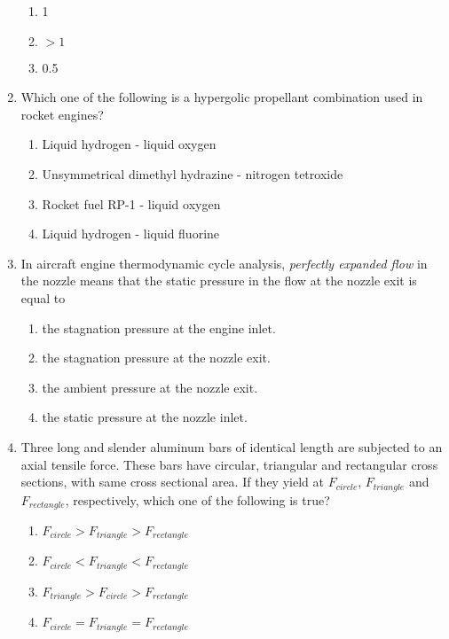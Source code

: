 \documentclass[journal]{IEEEtran}
\begin{document}
\begin{enumerate}
\begin{enumerate}
			\item 1
			\item $> 1$
			\item 0.5
		\end{enumerate}
	\item
	Which one of the following is a hypergolic propellant combination used in rocket engines?
		\begin{enumerate}
			\item Liquid hydrogen - liquid oxygen
			\item Unsymmetrical dimethyl hydrazine - nitrogen tetroxide
			\item Rocket fuel RP-1 - liquid oxygen
			\item Liquid hydrogen - liquid fluorine
		\end{enumerate}
	\item
	In aircraft engine thermodynamic cycle analysis, \textit{perfectly expanded flow} in the nozzle means that the static pressure in the flow at the nozzle exit is equal to
		\begin{enumerate}
			\item the stagnation pressure at the engine inlet.
			\item the stagnation pressure at the nozzle exit.
			\item the ambient pressure at the nozzle exit.
			\item the static pressure at the nozzle inlet.
		\end{enumerate}
	\item
	Three long and slender aluminum bars of identical length are subjected to an axial tensile force. These bars have circular, triangular and rectangular cross sections, with same cross sectional area. If they yield at $F_{circle}$, $F_{triangle}$ and $F_{rectangle}$, respectively, which one of the following is true?
		\begin{enumerate}
			\item $F_{circle} > F_{triangle} > F_{rectangle}$
			\item $F_{circle} < F_{triangle} < F_{rectangle}$
			\item $F_{triangle} > F_{circle} > F_{rectangle}$
			\item $F_{circle} = F_{triangle} = F_{rectangle}$
		\end{enumerate}
\end{enumerate}
\end{document}
